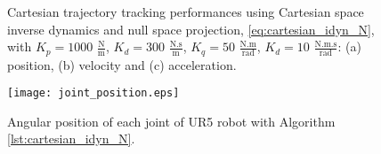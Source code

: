 \begin{figure}%
	\centering
	\caption{Cartesian trajectory tracking performances using Cartesian space inverse dynamics and null space projection, \eqref{eq:cartesian_idyn_N}, with  ${K_{p}}=1000$ $\mathrm{\frac{N}{m}}$, $K_{d}= 300$ $\mathrm{\frac{N.s}{m}}$, ${K_{q}}=50$ $\mathrm{\frac{N.m}{rad}}$, $K_{d}= 10$ $\mathrm{\frac{N.m.s}{rad}}$: (a) position, (b) velocity and (c) acceleration.}
	\label{fig:act_2.1_ee_position}
\end{figure}

\begin{figure}
    \centering
    \texttt{[image: joint\_position.eps]}	
    \caption{Angular position of each joint of UR5 robot with Algorithm \ref{lst:cartesian_idyn_N}.}
    \label{fig:act_2.1_joint_position}
\end{figure}
